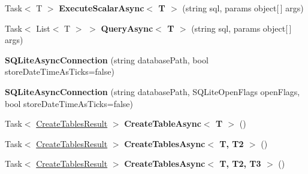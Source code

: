 \begin{DoxyCompactItemize}
\item 
\hypertarget{classSQLite_1_1SQLiteAsyncConnection_adae67f753b244b754cc33be48cafbf67}{Task$<$ T $>$ {\bfseries Execute\-Scalar\-Async$<$ T $>$} (string sql, params object\mbox{[}$\,$\mbox{]} args)}\label{classSQLite_1_1SQLiteAsyncConnection_adae67f753b244b754cc33be48cafbf67}

\item 
\hypertarget{classSQLite_1_1SQLiteAsyncConnection_a8a81a54a5769d761562d9a3ce18b0f57}{Task$<$ List$<$ T $>$ $>$ {\bfseries Query\-Async$<$ T $>$} (string sql, params object\mbox{[}$\,$\mbox{]} args)}\label{classSQLite_1_1SQLiteAsyncConnection_a8a81a54a5769d761562d9a3ce18b0f57}

\item 
\hypertarget{classSQLite_1_1SQLiteAsyncConnection_a6b26a70d833ede366339dcdf0ac4ddec}{{\bfseries S\-Q\-Lite\-Async\-Connection} (string database\-Path, bool store\-Date\-Time\-As\-Ticks=false)}\label{classSQLite_1_1SQLiteAsyncConnection_a6b26a70d833ede366339dcdf0ac4ddec}

\item 
\hypertarget{classSQLite_1_1SQLiteAsyncConnection_abf2621d98094e8cc5702655eec267cec}{{\bfseries S\-Q\-Lite\-Async\-Connection} (string database\-Path, S\-Q\-Lite\-Open\-Flags open\-Flags, bool store\-Date\-Time\-As\-Ticks=false)}\label{classSQLite_1_1SQLiteAsyncConnection_abf2621d98094e8cc5702655eec267cec}

\item 
\hypertarget{classSQLite_1_1SQLiteAsyncConnection_a120dc02c80780a01f9158aa2dc4110e3}{Task$<$ \hyperlink{classSQLite_1_1CreateTablesResult}{Create\-Tables\-Result} $>$ {\bfseries Create\-Table\-Async$<$ T $>$} ()}\label{classSQLite_1_1SQLiteAsyncConnection_a120dc02c80780a01f9158aa2dc4110e3}

\item 
\hypertarget{classSQLite_1_1SQLiteAsyncConnection_a1911c2250387bf7db96a05d4ab73bfe7}{Task$<$ \hyperlink{classSQLite_1_1CreateTablesResult}{Create\-Tables\-Result} $>$ {\bfseries Create\-Tables\-Async$<$ T, T2 $>$} ()}\label{classSQLite_1_1SQLiteAsyncConnection_a1911c2250387bf7db96a05d4ab73bfe7}

\item 
\hypertarget{classSQLite_1_1SQLiteAsyncConnection_a0d18028757d84c1d5ef6b4f0a2f31bf8}{Task$<$ \hyperlink{classSQLite_1_1CreateTablesResult}{Create\-Tables\-Result} $>$ {\bfseries Create\-Tables\-Async$<$ T, T2, T3 $>$} ()}\label{classSQLite_1_1SQLiteAsyncConnection_a0d18028757d84c1d5ef6b4f0a2f31bf8}


\end{DoxyCompactItemize}
